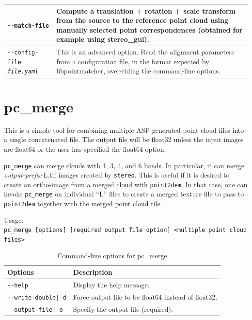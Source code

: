 \begin{longtable}{|p{8cm}|p{9cm}|}
\texttt{-\/-match-file} & Compute a translation + rotation + scale transform from the source to the reference point cloud using manually selected point correspondences (obtained for example using stereo\_gui). \\ \hline

\texttt{-\/-config-file \textit{file.yaml}} & This is an advanced
option. Read the alignment parameters from a configuration file, in the
format expected by libpointmatcher, over-riding the command-line options.\\ \hline

\end{longtable}




\section{pc\_merge}
\label{pcmerge}

This is a simple tool for combining multiple ASP-generated point cloud files into
a single concatenated file.  The output file will be float32 unless the input images
are float64 or the user has specified the float64 option.

\texttt{pc\_merge} can merge clouds with
1, 3, 4, and 6 bands. In particular, it can merge \textit{output-prefix}-L.tif images
created by \texttt{stereo}. This is useful if it is desired to create an
ortho-image from a merged cloud with \texttt{point2dem}. In that case,
one can invoke \texttt{pc\_merge} on individual ``L'' files to create a
merged texture file to pass to \texttt{point2dem} together with the
merged point cloud tile.


\medskip

Usage:\\
\hspace*{2em}\texttt{pc\_merge [options] [required output file option] <multiple point cloud files>}

\medskip

\begin{longtable}{|l|p{10cm}|}
\caption{Command-line options for pc\_merge}
\label{tbl:pcmerge}
\endfirsthead
\endhead
\endfoot
\endlastfoot
\hline
Options & Description \\ \hline \hline
\texttt{-\/-help} & Display the help message.\\ \hline
\texttt{-\/-write-double|-d} & Force output file to be float64 instead of float32.\\ \hline
\texttt{-\/-output-file|-o} & Specify the output file (required).\\ \hline
\end{longtable}




